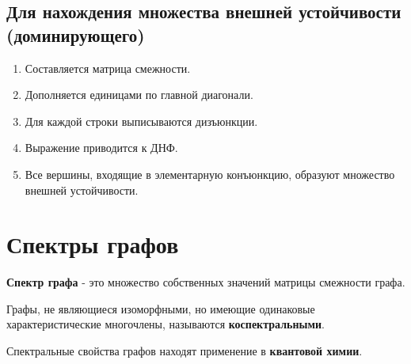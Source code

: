 {\subsection*{Для нахождения множества внешней устойчивости (доминирующего)}

\begin{enumerate}
  \item Составляется матрица смежности.
  \item Дополняется единицами по главной диагонали.
  \item Для каждой строки выписываются дизъюнкции.
  \item Выражение приводится к ДНФ.
  \item Все вершины, входящие в элементарную конъюнкцию, образуют множество внешней устойчивости.
\end{enumerate}

\section*{Спектры графов}

\textbf{Спектр графа} - это множество собственных значений матрицы смежности графа.

Графы, не являющиеся изоморфными, но имеющие одинаковые характеристические многочлены, называются \textbf{коспектральными}.

Спектральные свойства графов находят применение в \textbf{квантовой химии}.


    \newpage
}
